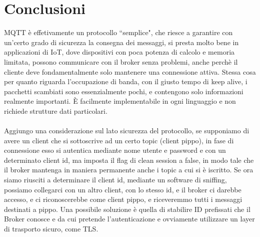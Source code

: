 \documentclass{article}
\begin{document}
\section{Conclusioni}
MQTT è effetivamente un protocollo ``semplice", che riesce a garantire con un'certo grado di sicurezza la consegna dei messaggi, si presta molto bene in applicazioni di IoT, dove dispositivi con poca potenza di calcolo e memoria limitata, possono communicare con il broker senza problemi, anche perchè il cliente deve fondamentalmente solo mantenere una connessione attiva. Stessa cosa per quanto riguarda l'occupazione di banda, con il giusto tempo di keep alive, i pacchetti scambiati sono essenzialmente pochi, e contengono solo informazioni realmente importanti. È facilmente implementabile in ogni linguaggio e non richiede strutture dati particolari.\\\\Aggiungo una considerazione sul lato sicurezza del protocollo, se supponiamo di avere un client che si sottoscrive ad un certo topic (client pippo), in fase di connessione esso si autentica mediante nome utente e password e con un determinato client id, ma imposta il flag di clean session a false, in modo tale che il broker mantenga in maniera permanente anche i topic a cui si è iscritto. Se ora siamo riusciti a determinare il client id, mediante un software di sniffing, possiamo collegarci con un altro client, con lo stesso id, e il broker ci darebbe accesso, e ci riconoscerebbe come client pippo, e riceveremmo tutti i messaggi destinati a pippo. Una possibile soluzione è quella di stabilire ID prefissati che il Broker conosce e da cui pretende l'autenticazione e ovviamente utilizzare un layer di trasporto sicuro, come TLS.
\end{document}
